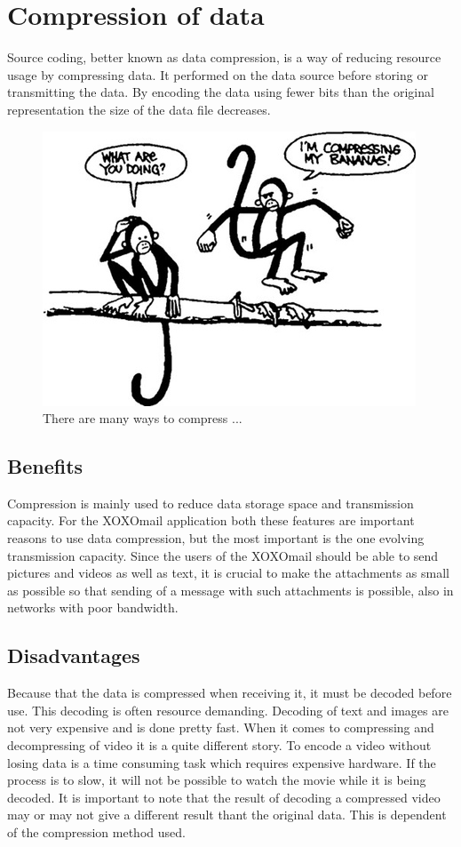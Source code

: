 
\section{Compression of data}

Source coding, better known as data compression, is a way of reducing resource usage by compressing data. It performed on the data source before storing or transmitting the data. By encoding the data using fewer bits than the original representation the size of the data file decreases.

\begin{figure}
\begin{center}
\includegraphics[scale=0.5]{compressionmonkeys}
\caption{There are many ways to compress ... \cite{bib:compressionImage}}
\end{center}
\end{figure}

\subsection{Benefits}
Compression is mainly used to reduce data storage space and transmission capacity. For the XOXOmail application both these features are important reasons to use data compression, but the most important is the one evolving transmission capacity. Since the users of the XOXOmail should be able to send pictures and videos as well as text, it is crucial to make the attachments as small as possible so that sending of a message with such attachments is possible, also in networks with poor bandwidth.

\subsection{Disadvantages}
Because that the data is compressed when receiving it, it must be decoded before use. This decoding is often resource demanding. Decoding of text and images are not very expensive and is done pretty fast.  When it comes to compressing and decompressing of video it is a quite different story. To encode a video without losing data is a time consuming task which requires expensive hardware. If the process is to slow, it will not be possible to watch the movie while it is being decoded. It is important to note that the result of decoding a compressed video may or may not give a different result thant the original data. This is dependent of the compression method used.
   
